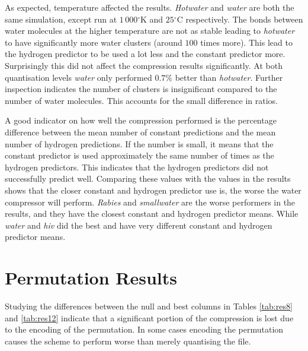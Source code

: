 \documentclass[a4paper]{report}
\newcommand{\degree}{\ensuremath{^\circ}}
\begin{document}
As expected, temperature affected the results. \emph{Hotwater} and
\emph{water} are both the same simulation, except run at $1\,000\degree$K and
$25\degree$C respectively. The bonds between water molecules at the higher
temperature are not as stable leading to \emph{hotwater} to have significantly
more water clusters (around $100$ times more). This lead to the hydrogen
predictor to be used a lot less and the constant predictor more. Surprisingly
this did not affect the compression results significantly. At both
quantisation levels \emph{water} only performed $0.7\%$ better than
\emph{hotwater}. Further inspection indicates the number of clusters is
insignificant compared to the number of water molecules. This accounts for the
small difference in ratios.

A good indicator on how well the compression performed is the percentage
difference between the mean number of constant predictions and the mean number
of hydrogen predictions. If the number is small, it means that the constant
predictor is used approximately the same number of times as the hydrogen
predictors. This indicates that the hydrogen predictors did not successfully
predict well. Comparing these values with the values in the results shows that
the closer constant and hydrogen predictor use is, the worse the water
compressor will perform. \emph{Rabies} and \emph{smallwater} are the worse
performers in the results, and they have the closest constant and hydrogen
predictor means. While \emph{water} and \emph{hiv} did the best and have very
different constant and hydrogen predictor means.



\section{Permutation Results}

Studying the differences between the null and best columns in Tables
\ref{tab:res8} and \ref{tab:res12} indicate that a significant portion of the
compression is lost due to the encoding of the permutation. In some cases
encoding the permutation causes the scheme to perform worse than merely
quantising the file.
\end{document}
